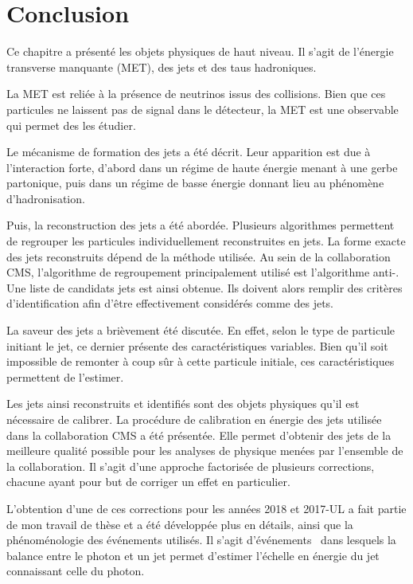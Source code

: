 \section{Conclusion}\label{chapter-HLO-section-conclusion}
Ce chapitre a présenté les objets physiques de haut niveau.
Il s'agit de l'énergie transverse manquante (MET), des jets et des taus hadroniques.
\par
La MET est reliée à la présence de neutrinos issus des collisions.
Bien que ces particules ne laissent pas de signal dans le détecteur, la MET est une observable qui permet des les étudier.
\par
Le mécanisme de formation des jets a été décrit.
Leur apparition est due à l'interaction forte, d'abord dans un régime de haute énergie menant à une gerbe partonique, puis dans un régime de basse énergie donnant lieu au phénomène d'hadronisation.
\par
Puis, la reconstruction des jets a été abordée.
Plusieurs algorithmes permettent de regrouper les particules individuellement reconstruites en jets.
La forme exacte des jets reconstruits dépend de la méthode utilisée.
Au sein de la collaboration CMS, l'algorithme de regroupement principalement utilisé est l'algorithme \og anti-\kT \fg.
Une liste de \og candidats \fg{} jets est ainsi obtenue.
Ils doivent alors remplir des critères d'identification afin d'être effectivement considérés comme des jets.
\par La saveur des jets a brièvement été discutée.
En effet, selon le type de particule initiant le jet, ce dernier présente des caractéristiques variables.
Bien qu'il soit impossible de remonter à coup sûr à cette particule initiale, ces caractéristiques permettent de l'estimer.
\par Les jets ainsi reconstruits et identifiés sont des objets physiques qu'il est nécessaire de calibrer.
La procédure de calibration en énergie des jets utilisée dans la collaboration CMS a été présentée.
Elle permet d'obtenir des jets de la meilleure qualité possible pour les analyses de physique menées par l'ensemble de la collaboration.
Il s'agit d'une approche factorisée de plusieurs corrections, chacune ayant pour but de corriger un effet en particulier.
\par L'obtention d'une de ces corrections pour les années 2018 et 2017-UL a fait partie de mon travail de thèse et a été développée plus en détails, ainsi que la phénoménologie des événements utilisés.
Il s'agit d'événements \Gjets\ dans lesquels la balance entre le photon et un jet permet d'estimer l'échelle en énergie du jet connaissant celle du photon.
